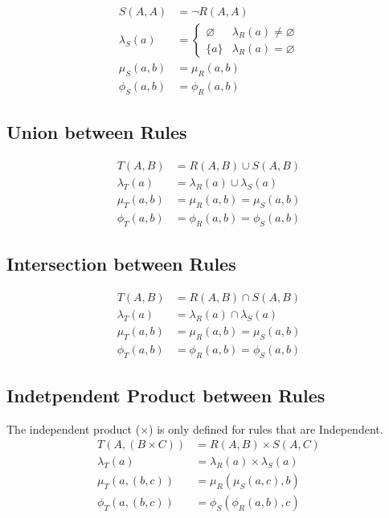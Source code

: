 \documentclass{article}
\theoremstyle{definition}
\theoremstyle{plain}
\begin{document}
\begin{align}
          S (A, A) & = \neg R (A, A) \\
  \lambda_S (a)    & = \begin{cases} \varnothing & \lambda_R (a) \neq \varnothing \\ \{ a \} & \lambda_R (a) = \varnothing \end{cases} \\
      \mu_S (a, b)    & =  \mu_R (a, b) \\
     \phi_S (a, b)    & = \phi_R (a, b) 
\end{align}

\subsection{Union between Rules}

\begin{align}
          T (A, B) & = R (A, B) \cup S (A, B) \\
  \lambda_T (a)    & = \lambda_R (a) \cup \lambda_S (a) \\
      \mu_T (a, b) & = \mu_R  (a, b)    = \mu_S  (a, b) \\
     \phi_T (a, b) & = \phi_R (a, b)    = \phi_S (a, b)
\end{align}

\subsection{Intersection between Rules}

\begin{align}
          T (A, B) & = R (A, B) \cap S (A, B) \\
  \lambda_T (a)    & = \lambda_R (a) \cap \lambda_S (a) \\
      \mu_T (a, b) & =  \mu_R (a, b) =  \mu_S (a, b) \\
     \phi_T (a, b) & = \phi_R (a, b) = \phi_S (a, b)
\end{align}

\subsection{Indetpendent Product between Rules}
The independent product ($ \times $) is only defined for rules that are Independent.
\begin{align}
          T (A, (B \times C)) & = R (A, B) \times S (A, C) \\
  \lambda_T (a)               & = \lambda_R (a) \times \lambda_S (a) \\
      \mu_T (a, (b, c))       & =  \mu_R  ( \mu_S (a, c), b) \\
     \phi_T (a, (b, c))       & = \phi_S  (\phi_R (a, b), c) 
\end{align}
\end{document}

